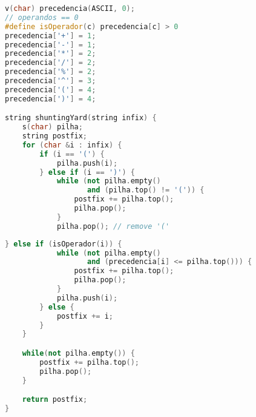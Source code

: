 
\begin{lstlisting}[language=C++]
v(char) precedencia(ASCII, 0);
// operandos == 0
#define isOperador(c) precedencia[c] > 0
precedencia['+'] = 1;
precedencia['-'] = 1;
precedencia['*'] = 2;
precedencia['/'] = 2;
precedencia['%'] = 2;
precedencia['^'] = 3;
precedencia['('] = 4;
precedencia[')'] = 4;

string shuntingYard(string infix) {
	s(char) pilha;
	string postfix;
	for (char &i : infix) {
		if (i == '(') {
			pilha.push(i);
		} else if (i == ')') {
			while (not pilha.empty() 
			       and (pilha.top() != '(')) {
				postfix += pilha.top();
				pilha.pop();
			}
			pilha.pop(); // remove '('
\end{lstlisting}

\begin{lstlisting}[language=C++, title=Shunting-Yard (cont.)]
		} else if (isOperador(i)) {
			while (not pilha.empty() 
			       and (precedencia[i] <= pilha.top())) {
				postfix += pilha.top();
				pilha.pop();
			}
			pilha.push(i);
		} else {
			postfix += i;
		}
	}

	while(not pilha.empty()) {
		postfix += pilha.top();
		pilha.pop();
	}

	return postfix;
}
\end{lstlisting}
